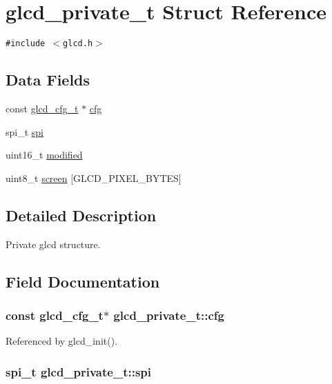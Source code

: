 \hypertarget{structglcd__private__t}{
\section{glcd\_\-private\_\-t Struct Reference}
\label{structglcd__private__t}
}
{\tt \#include $<$glcd.h$>$}

\subsection*{Data Fields}
\begin{CompactItemize}
\item 
const \hyperlink{structglcd__cfg__t}{glcd\_\-cfg\_\-t} $\ast$ \hyperlink{structglcd__private__t_f61ccee412576720eb398c8d70d0ac50}{cfg}
\item 
spi\_\-t \hyperlink{structglcd__private__t_c8a33d8649705b434548d92b1dad04bd}{spi}
\item 
uint16\_\-t \hyperlink{structglcd__private__t_2d461f58688ef3f69b8d4adb40564ee5}{modified}
\item 
uint8\_\-t \hyperlink{structglcd__private__t_0f132b59644c2141c547173ba7089f3d}{screen} \mbox{[}GLCD\_\-PIXEL\_\-BYTES\mbox{]}
\end{CompactItemize}


\subsection{Detailed Description}
Private glcd structure. 

\subsection{Field Documentation}
\hypertarget{structglcd__private__t_f61ccee412576720eb398c8d70d0ac50}{
\subsubsection{\setlength{\rightskip}{0pt plus 5cm}const {\bf glcd\_\-cfg\_\-t}$\ast$ {\bf glcd\_\-private\_\-t::cfg}}}
\label{structglcd__private__t_f61ccee412576720eb398c8d70d0ac50}




Referenced by glcd\_\-init().\hypertarget{structglcd__private__t_c8a33d8649705b434548d92b1dad04bd}{
\subsubsection{\setlength{\rightskip}{0pt plus 5cm}spi\_\-t {\bf glcd\_\-private\_\-t::spi}}}
\label{structglcd__private__t_c8a33d8649705b434548d92b1dad04bd}




